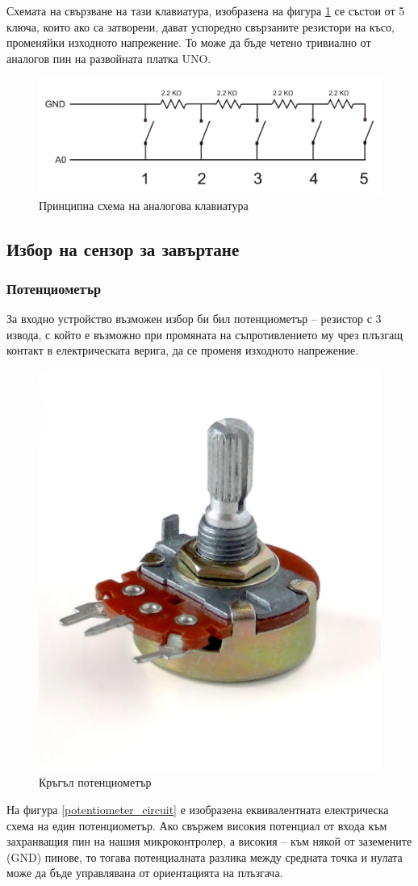 \documentclass[titlepage, oneside, 14pt]{extbook}
\begin{document}
Схемата на свързване на тази клавиатура, изобразена на фигура \ref{keypad_circuit} се състои от 5 ключа, които ако са затворени,
дават успоредно свързаните резистори на късо, променяйки изходното напрежение. То може
да бъде четено тривиално от аналогов пин на развойната платка UNO.

\begin{figure}[!htbp]
    \centering
    \includegraphics[width=0.5\linewidth]{img/keypad_circuit.png}
    \caption{Принципна схема на аналогова клавиатура}
    \label{keypad_circuit}
\end{figure}

\subsection{Избор на сензор за завъртане}

\subsubsection{Потенциометър}

За входно устройство възможен избор би бил потенциометър \cite{potent} --
резистор с 3 извода, с който е възможно при промяната на съпротивлението му
чрез плъзгащ контакт в електрическата верига, да се променя изходното напрежение.

\begin{figure}[!htbp]
    \centering
    \includegraphics[width=0.3\linewidth]{img/potentiometer.png}
    \caption{Кръгъл потенциометър}
\end{figure}

На фигура \ref{potentiometer_circuit} е изобразена еквивалентната електрическа схема на един потенциометър.
Ако свържем високия потенциал от входа към захранващия пин на нашия микроконтролер,
а високия -- към някой от заземените (GND) пинове, то тогава потенциалната разлика между
средната точка и нулата може да бъде управлявана от ориентацията на плъзгача.
\end{document}
